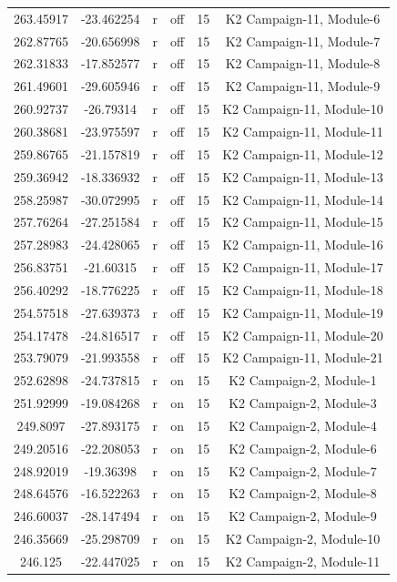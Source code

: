 \documentclass[11pt]{article}
\begin{document}
\begin{center}
\begin{longtable}{|c|c|c|c|c|c|}
263.45917 & -23.462254 & r & off &15 & K2 Campaign-11, Module-6\\
262.87765 & -20.656998 & r & off &15 & K2 Campaign-11, Module-7\\
262.31833 & -17.852577 & r & off &15 & K2 Campaign-11, Module-8\\
261.49601 & -29.605946 & r & off &15 & K2 Campaign-11, Module-9\\
260.92737 & -26.79314 & r & off &15 & K2 Campaign-11, Module-10\\
260.38681 & -23.975597 & r & off &15 & K2 Campaign-11, Module-11\\
259.86765 & -21.157819 & r & off &15 & K2 Campaign-11, Module-12\\
259.36942 & -18.336932 & r & off &15 & K2 Campaign-11, Module-13\\
258.25987 & -30.072995 & r & off &15 & K2 Campaign-11, Module-14\\
257.76264 & -27.251584 & r & off &15 & K2 Campaign-11, Module-15\\
257.28983 & -24.428065 & r & off &15 & K2 Campaign-11, Module-16\\
256.83751 & -21.60315 & r & off &15 & K2 Campaign-11, Module-17\\
256.40292 & -18.776225 & r & off &15 & K2 Campaign-11, Module-18\\
254.57518 & -27.639373 & r & off &15 & K2 Campaign-11, Module-19\\
254.17478 & -24.816517 & r & off &15 & K2 Campaign-11, Module-20\\
253.79079 & -21.993558 & r & off &15 & K2 Campaign-11, Module-21\\
252.62898 & -24.737815 & r & on &15 & K2 Campaign-2, Module-1\\
251.92999 & -19.084268 & r & on &15 & K2 Campaign-2, Module-3\\
249.8097 & -27.893175 & r & on &15 & K2 Campaign-2, Module-4\\
249.20516 & -22.208053 & r & on &15 & K2 Campaign-2, Module-6\\
248.92019 & -19.36398 & r & on &15 & K2 Campaign-2, Module-7\\
248.64576 & -16.522263 & r & on &15 & K2 Campaign-2, Module-8\\
246.60037 & -28.147494 & r & on &15 & K2 Campaign-2, Module-9\\
246.35669 & -25.298709 & r & on &15 & K2 Campaign-2, Module-10\\
246.125 & -22.447025 & r & on &15 & K2 Campaign-2, Module-11\\

\end{longtable}
\end{center}
\end{document}
